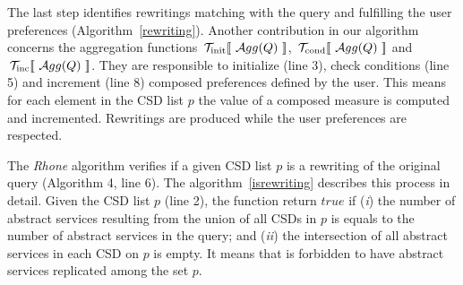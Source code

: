 %
The last step identifies rewritings matching with the query and fulfilling the user preferences (Algorithm~\ref{rewriting}). %
%
%
Another contribution in our algorithm concerns the aggregation functions $~\!\hbox{${\cal T}_{\mathrm{init}} [\![\ {\cal A}{gg}(Q)\ ]\!]$}$, $~\!\hbox{${\cal T}_{\mathrm{cond}} [\![\ {\cal A}{gg}(Q)\ ]\!]$}$ and $~\!\hbox{${\cal T}_{\mathrm{inc}} [\![\ {\cal A}{gg}(Q)\ ]\!]$}$.
They are responsible to initialize (line 3), check conditions (line 5) and increment (line 8) composed preferences defined by the user.
This means for each element in the CSD list $p$ the value of a composed measure is computed and incremented. 
Rewritings are produced while the user preferences are respected. 

The \textit{Rhone} algorithm verifies if a given CSD list $p$ is a rewriting
of the original query (Algorithm 4, line 6).
The algorithm~\ref{isrewriting} describes this process in detail. 
Given the CSD list $p$ (line 2), the function return $true$ if (\textit{i}) the number of
abstract services resulting from the union of all CSDs in $p$ is equals to
the number of abstract services in the query; and (\textit{ii}) the intersection
of all abstract services in each CSD on $p$ is empty.
It means that is forbidden to have abstract services replicated among the set $p$.

%

